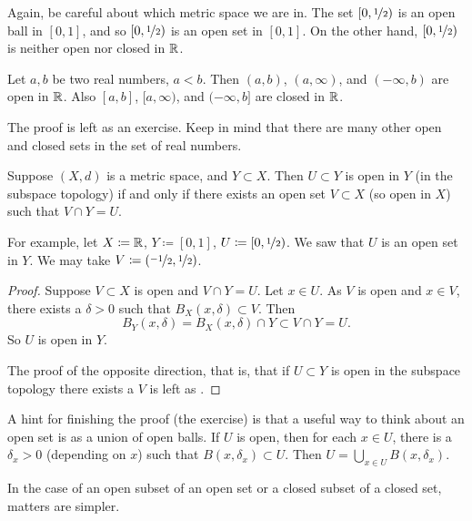 Again, be careful about which metric space we are in.
The set $[0,\nicefrac{1}{2})$ is
an open ball in $[0,1]$, and so $[0,\nicefrac{1}{2})$ is
an open set in $[0,1]$.  On the other hand, $[0,\nicefrac{1}{2})$
is neither open nor closed in ${\mathbb{R}}$.

\begin{prop} \label{prop:topology:intervals:openclosed}
Let $a, b$ be two real numbers, $a < b$.  Then $(a,b)$, $(a,\infty)$,
and $(-\infty,b)$ are open in ${\mathbb{R}}$.
Also $[a,b]$, $[a,\infty)$,
and $(-\infty,b]$ are closed in ${\mathbb{R}}$.
\end{prop}

The proof is left as an exercise.  Keep in mind that
there are many other open and
closed sets in the set of real numbers. %

\begin{prop} \label{prop:topology:subspaceopen}
Suppose $(X,d)$ is a metric space, and $Y \subset X$.  Then $U \subset Y$
is open in $Y$ (in the subspace topology) if and only if
there exists an open set $V \subset X$ (so open in $X$) such that
$V \cap Y = U$.
\end{prop}

For example, let $X \coloneqq {\mathbb{R}}$, $Y \coloneqq [0,1]$, $U \coloneqq [0,\nicefrac{1}{2})$.
We saw that $U$ is an open set in $Y$.
We may take $V \coloneqq (\nicefrac{-1}{2},\nicefrac{1}{2})$.

\begin{proof}
Suppose $V \subset X$ is open and $V \cap Y = U$.
Let $x \in U$.
As $V$ is open and $x \in V$, there
exists a $\delta > 0$ such that $B_X(x,\delta) \subset V$.
Then
\begin{equation*}
B_Y(x,\delta) = B_X(x,\delta) \cap Y \subset V \cap Y = U .
\end{equation*}
So $U$ is open in $Y$.

The proof of the opposite direction, that is, that if $U \subset Y$
is open in the subspace topology there exists a $V$ is left as
.
\end{proof}

A hint for finishing the proof (the exercise) is that
a useful way to think about an open set is as a union of open balls.  If $U$ is
open, then for each $x \in U$, there is a $\delta_x > 0$ (depending on $x$) such that
$B(x,\delta_x) \subset U$.  Then $U = \bigcup_{x\in U} B(x,\delta_x)$.

In the case of an open subset of an open set or a closed subset of a closed
set, matters are simpler.

